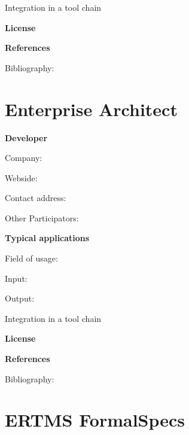 \documentclass{./template/openetcs_report}
\begin{document}
	Integration in a tool chain



	\textbf{License}


	\textbf{References}

	Bibliography:


\section{Enterprise Architect}

	\textbf{Developer}

	Company: 

	Webside:

	Contact address:

	Other  Participators:



	\textbf{Typical applications}

	Field of usage:


	Input:

	Output:





	Integration in a tool chain



	\textbf{License}


	\textbf{References}

	Bibliography:


\section{ERTMS FormalSpecs}
\end{document}
